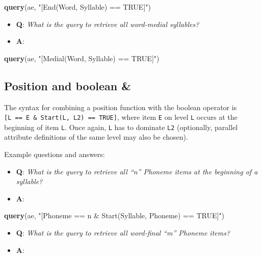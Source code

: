 \documentclass[]{book}
\newenvironment{Shaded}{\begin{snugshade}}{\end{snugshade}}
\newcommand{\KeywordTok}[1]{\textcolor[rgb]{0.13,0.29,0.53}{\textbf{#1}}}
\newcommand{\NormalTok}[1]{#1}
\newcommand{\StringTok}[1]{\textcolor[rgb]{0.31,0.60,0.02}{#1}}
\providecommand{\tightlist}{%
  \setlength{\itemsep}{0pt}\setlength{\parskip}{0pt}}
\begin{document}
\begin{Shaded}
\begin{Highlighting}[]
\KeywordTok{query}\NormalTok{(ae, }\StringTok{"[End(Word, Syllable) == TRUE]"}\NormalTok{)}
\end{Highlighting}
\end{Shaded}

\begin{itemize}
\tightlist
\item
  \textbf{Q}: \emph{What is the query to retrieve all word-medial syllables?}
\item
  \textbf{A}:
\end{itemize}

\begin{Shaded}
\begin{Highlighting}[]
\KeywordTok{query}\NormalTok{(ae, }\StringTok{"[Medial(Word, Syllable) == TRUE]"}\NormalTok{)}
\end{Highlighting}
\end{Shaded}

\hypertarget{position-and-boolean}{%
\subsection{Position and boolean \&}\label{position-and-boolean}}

The syntax for combining a position function with the boolean operator is \texttt{{[}L\ ==\ E\ \&\ Start(L,\ L2)\ ==\ TRUE{]}}, where item \texttt{E} on level \texttt{L} occurs at the beginning of item \texttt{L}. Once again, \texttt{L} has to dominate \texttt{L2} (optionally, parallel attribute definitions of the same level may also be chosen).

Example questions and answers:

\begin{itemize}
\tightlist
\item
  \textbf{Q}: \emph{What is the query to retrieve all ``n'' Phoneme items at the beginning of a syllable?}
\item
  \textbf{A}:
\end{itemize}

\begin{Shaded}
\begin{Highlighting}[]
\KeywordTok{query}\NormalTok{(ae, }\StringTok{"[Phoneme == n & Start(Syllable, Phoneme) == TRUE]"}\NormalTok{)}
\end{Highlighting}
\end{Shaded}

\begin{itemize}
\tightlist
\item
  \textbf{Q}: \emph{What is the query to retrieve all word-final ``m'' Phoneme items?}
\item
  \textbf{A}:
\end{itemize}
\end{document}
